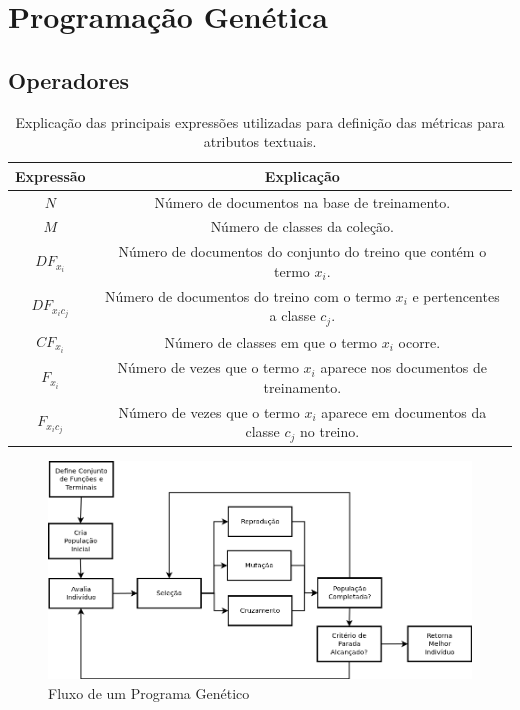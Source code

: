 
\section{Programação Genética}

 

\subsection{Operadores}



\begin{table}[ht*]
\centering
\begin{tabular}{|c|c|}
\toprule
    \textbf{Expressão} & \textbf{Explicação} \\
\midrule
    $N$           & Número de documentos na base de treinamento. \tabularnewline \hline
    $M$           & Número de classes da coleção. \tabularnewline \hline
    $DF_{x_i} $   & Número de documentos do conjunto do treino que contém o termo $x_i$. \tabularnewline \hline
    $DF_{x_ic_j}$ & Número de documentos do treino com o termo $x_i$ e pertencentes a classe $c_j$. \tabularnewline \hline
    $CF_{x_i}$    & Número de classes em que o termo $x_i$ ocorre. \tabularnewline \hline 
    $F_{x_i}$     & Número de vezes que o termo $x_i$ aparece nos documentos de treinamento. \tabularnewline \hline
    $F_{x_ic_j}$  & Número de vezes que o termo $x_i$ aparece em documentos da classe $c_j$ no treino. \tabularnewline 
\bottomrule
\end{tabular}
\caption{Explicação das principais expressões utilizadas para definição das métricas para atributos textuais.}
\label{table::metricas_textuais}
\end{table}



\begin{figure}[ht!]
\centering
\includegraphics[width=1.0\textwidth]{figures/gpwf.png}
\caption{Fluxo de um Programa Genético}
\label{fig::vizinhos}
\end{figure}



